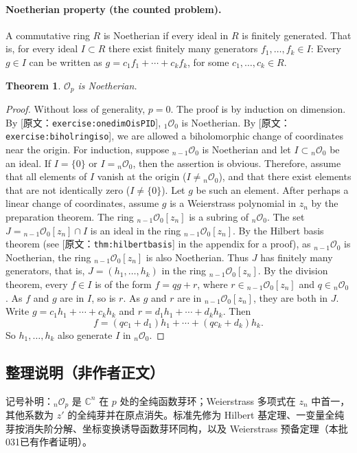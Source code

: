 \documentclass[UTF8,11pt]{ctexart}
\newtheorem*{thm}{Theorem}
\theoremstyle{definition}
\newcommand{\C}{\mathbb C}
\newcommand{\sO}{\mathscr O}
\newcommand{\sourceref}[1]{\textnormal{[原文：\nolinkurl{#1}]}}
\newcommand{\thmref}[1]{\sourceref{#1}}
\newcommand{\exerciseref}[1]{\sourceref{#1}}
\begin{document}
\paragraph{Noetherian property (the counted problem).}
A commutative ring $R$ is Noetherian if every ideal in $R$ is finitely generated. That is, for every ideal $I\subset R$ there exist finitely many generators $f_1,\ldots,f_k\in I$: Every $g\in I$ can be written as $g=c_1f_1+\cdots+c_kf_k$, for some $c_1,\ldots,c_k\in R$.
\begin{thm}
$\sO_p$ is Noetherian.
\end{thm}
\begin{proof}
Without loss of generality, $p=0$. The proof is by induction on dimension. By \exerciseref{exercise:onedimOisPID}, ${}_1\sO_0$ is Noetherian. By \exerciseref{exercise:biholringiso}, we are allowed a biholomorphic change of coordinates near the origin. For induction, suppose ${}_{n-1}\sO_0$ is Noetherian and let $I\subset{}_n\sO_0$ be an ideal. If $I=\{0\}$ or $I={}_n\sO_0$, then the assertion is obvious. Therefore, assume that all elements of $I$ vanish at the origin ($I\neq{}_n\sO_0$), and that there exist elements that are not identically zero ($I\neq\{0\}$). Let $g$ be such an element. After perhaps a linear change of coordinates, assume $g$ is a Weierstrass polynomial in $z_n$ by the preparation theorem. The ring ${}_{n-1}\sO_0[z_n]$ is a subring of ${}_n\sO_0$. The set $J={}_{n-1}\sO_0[z_n]\cap I$ is an ideal in the ring ${}_{n-1}\sO_0[z_n]$. By the Hilbert basis theorem (see \thmref{thm:hilbertbasis} in the appendix for a proof), as ${}_{n-1}\sO_0$ is Noetherian, the ring ${}_{n-1}\sO_0[z_n]$ is also Noetherian. Thus $J$ has finitely many generators, that is, $J=(h_1,\ldots,h_k)$ in the ring ${}_{n-1}\sO_0[z_n]$. By the division theorem, every $f\in I$ is of the form $f=qg+r$, where $r\in{}_{n-1}\sO_0[z_n]$ and $q\in{}_n\sO_0$. As $f$ and $g$ are in $I$, so is $r$. As $g$ and $r$ are in ${}_{n-1}\sO_0[z_n]$, they are both in $J$. Write $g=c_1h_1+\cdots+c_kh_k$ and $r=d_1h_1+\cdots+d_kh_k$. Then
\[f=(qc_1+d_1)h_1+\cdots+(qc_k+d_k)h_k.\]
So $h_1,\ldots,h_k$ also generate $I$ in ${}_n\sO_0$.
\end{proof}

\subsection*{整理说明（非作者正文）}
记号补明：${}_n\sO_p$ 是 $\C^n$ 在 $p$ 处的全纯函数芽环；Weierstrass 多项式在 $z_n$ 中首一，其他系数为 $z'$ 的全纯芽并在原点消失。标准先修为 Hilbert 基定理、一变量全纯芽按消失阶分解、坐标变换诱导函数芽环同构，以及 Weierstrass 预备定理（本批031已有作者证明）。
\end{document}
